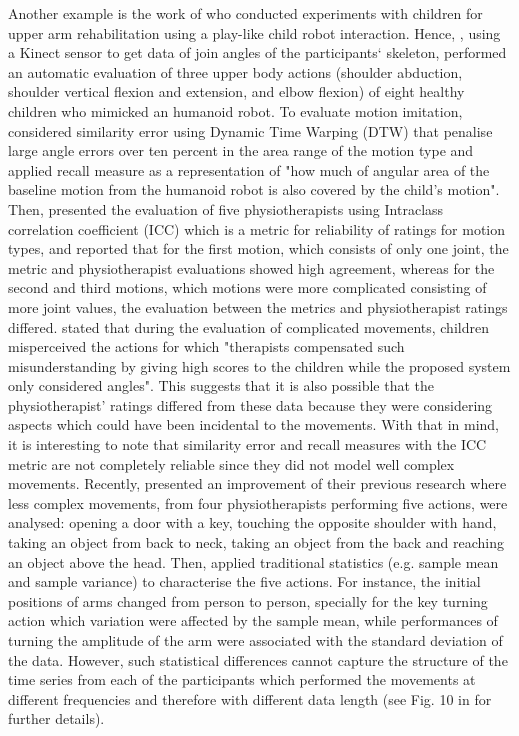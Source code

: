 Another example is the work of \cite{guneysu2014} who conducted experiments 
with children for upper 
arm rehabilitation using a play-like child robot interaction.
Hence, \cite{guneysu2014}, using a Kinect sensor to get data of join angles of 
the participants` skeleton, performed an automatic evaluation of three 
upper body actions (shoulder abduction, shoulder vertical flexion and 
extension, and elbow flexion) of eight healthy children who mimicked an 
humanoid robot. To evaluate motion imitation, \citealt[p. 202]{guneysu2014} 
considered similarity error using Dynamic Time Warping (DTW) that 
penalise large angle errors over ten percent in the area range of the 
motion type and applied recall measure as a representation of 
"how much of angular area of the baseline motion
from the humanoid robot is also covered by the child's motion".
Then, \cite{guneysu2014} presented the evaluation of five physiotherapists 
using Intraclass correlation coefficient (ICC) which is a metric for 
reliability of ratings for motion types, and reported that for the 
first motion, which consists of only one joint, the metric and 
physiotherapist evaluations showed high agreement, whereas for the 
second and third motions, which motions were more complicated 
consisting of more joint values, the evaluation between the metrics 
and physiotherapist ratings differed.
\citealt[p. 203]{guneysu2014} stated that during the evaluation of complicated 
movements, children misperceived the actions for which "therapists
compensated such misunderstanding by giving high scores to the children
while the proposed system only considered angles".
This suggests that it is also possible that the physiotherapist' ratings 
differed from these data because they were considering aspects 
which could have been incidental to the movements.
With that in mind, it is interesting to note that 
similarity error and recall measures with the ICC metric are not 
completely reliable since 
they did not model well complex movements.
Recently, \cite{guneysu2015} presented an improvement of their previous research
where less complex movements, from four physiotherapists performing five 
actions, were analysed: opening a door with a key, 
touching the opposite shoulder with hand, taking an object from back to neck, 
taking an object from the back and reaching an object above the head.
Then, \cite{guneysu2015} applied traditional statistics 
(e.g. sample mean and sample variance) to characterise the five actions.
For instance, the  initial positions of arms changed from person to person, 
specially for the key turning action which variation were affected by the 
sample mean, while performances of turning the amplitude of the arm
were associated with the standard deviation of the data.
However, such statistical differences cannot capture the structure of the 
time series from each of the participants which performed the movements
at different frequencies and therefore with different data length
(see Fig. 10 in \cite{guneysu2015} for further details).


